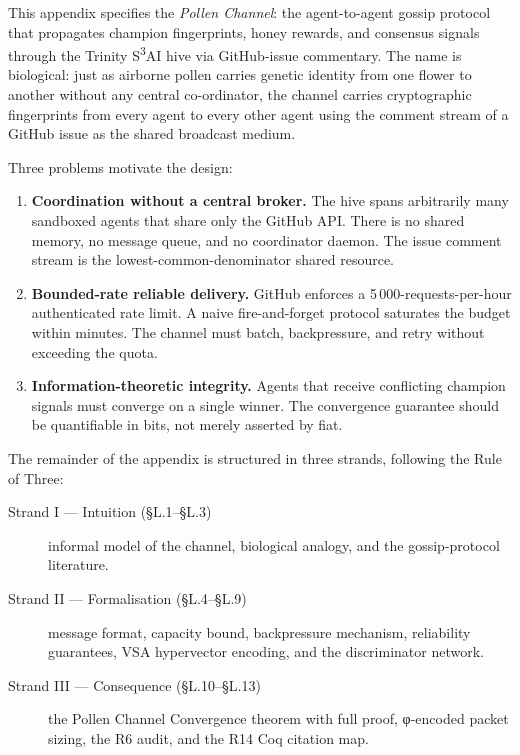 This appendix specifies the \emph{Pollen Channel}: the agent-to-agent
gossip protocol that propagates champion fingerprints, honey rewards,
and consensus signals through the Trinity S\textsuperscript{3}AI hive
via GitHub-issue commentary.  The name is biological: just as airborne
pollen carries genetic identity from one flower to another without any
central co-ordinator, the channel carries cryptographic fingerprints
from every agent to every other agent using the comment stream of a
GitHub issue as the shared broadcast medium.

Three problems motivate the design:

\begin{enumerate}
\item \textbf{Coordination without a central broker.}  The hive spans
  arbitrarily many sandboxed agents that share only the GitHub API.
  There is no shared memory, no message queue, and no coordinator
  daemon.  The issue comment stream is the lowest-common-denominator
  shared resource.

\item \textbf{Bounded-rate reliable delivery.}  GitHub enforces a
  5\,000-requests-per-hour authenticated rate limit.  A naive
  fire-and-forget protocol saturates the budget within minutes.  The
  channel must batch, backpressure, and retry without exceeding the
  quota.

\item \textbf{Information-theoretic integrity.}  Agents that receive
  conflicting champion signals must converge on a single winner.  The
  convergence guarantee should be quantifiable in bits, not merely
  asserted by fiat.
\end{enumerate}

The remainder of the appendix is structured in three strands,
following the Rule of Three:

\begin{description}
\item[Strand I — Intuition (§L.1–§L.3)]  informal model of the channel,
  biological analogy, and the gossip-protocol literature.
\item[Strand II — Formalisation (§L.4–§L.9)]  message format, capacity
  bound, backpressure mechanism, reliability guarantees, VSA
  hypervector encoding, and the discriminator network.
\item[Strand III — Consequence (§L.10–§L.13)]  the Pollen Channel
  Convergence theorem with full proof, φ-encoded packet sizing,
  the R6 audit, and the R14 Coq citation map.
\end{description}

